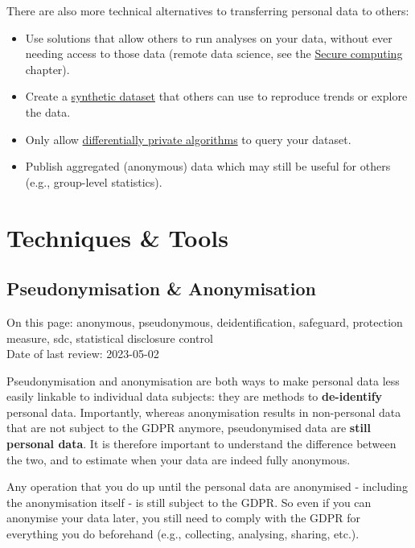 \documentclass[
]{book}
\providecommand{\tightlist}{%
  \setlength{\itemsep}{0pt}\setlength{\parskip}{0pt}}
\begin{document}
There are also more technical alternatives to transferring personal data to others:

\begin{itemize}
\tightlist
\item
  Use solutions that allow others to run analyses on your data, without ever
  needing access to those data (remote data science, see the
  \protect\hyperlink{secure-computation}{Secure computing} chapter).
\item
  Create a \protect\hyperlink{synthetic-data}{synthetic dataset} that others can use to reproduce
  trends or explore the data.
\item
  Only allow \protect\hyperlink{differential-privacy}{differentially private algorithms} to query
  your dataset.
\item
  Publish aggregated (anonymous) data which may still be useful for others
  (e.g., group-level statistics).
\end{itemize}

\hypertarget{part-techniques-tools}{%
\part*{Techniques \& Tools}\label{part-techniques-tools}}

\hypertarget{pseudonymisation-anonymisation}{%
\chapter{Pseudonymisation \& Anonymisation}\label{pseudonymisation-anonymisation}}

On this page: anonymous, pseudonymous, deidentification, safeguard, protection
measure, sdc, statistical disclosure control\\
Date of last review: 2023-05-02

Pseudonymisation and anonymisation are both ways to make personal data less
easily linkable to individual data subjects: they are methods to \textbf{de-identify}
personal data. Importantly, whereas anonymisation results in non-personal data
that are not subject to the GDPR anymore, pseudonymised data are \textbf{still personal
data}. It is therefore important to understand the difference between the two,
and to estimate when your data are indeed fully anonymous.

Any operation that you do up until the personal data are anonymised - including
the anonymisation itself - is still subject to the GDPR. So even if you can
anonymise your data later, you still need to comply with the GDPR for everything
you do beforehand (e.g., collecting, analysing, sharing, etc.).
\end{document}
